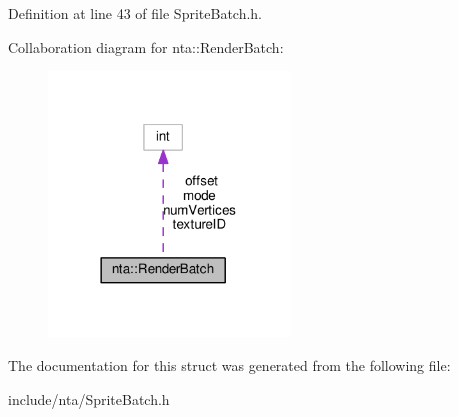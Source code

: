 Definition at line 43 of file Sprite\+Batch.\+h.



Collaboration diagram for nta\+:\+:Render\+Batch\+:\nopagebreak
\begin{figure}[H]
\begin{center}
\leavevmode
\includegraphics[width=182pt]{df/da4/structnta_1_1RenderBatch__coll__graph}
\end{center}
\end{figure}


The documentation for this struct was generated from the following file\+:\begin{DoxyCompactItemize}
\item 
include/nta/Sprite\+Batch.\+h\end{DoxyCompactItemize}
